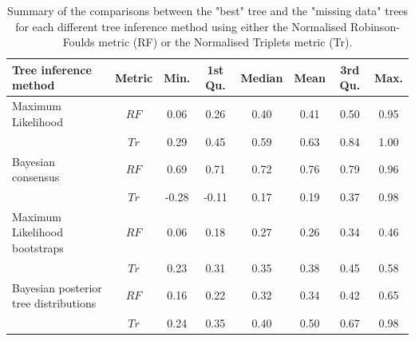 \documentclass[12pt,letterpaper]{article}
\begin{document}
\begin{landscape}
\begin{table}[ht]
\caption{Summary of the comparisons between the "best" tree and the "missing data" trees for each different tree inference method using either the Normalised Robinson-Foulds metric (RF) or the Normalised Triplets metric (Tr).}
\label{Tab_Supp_summary_metric_allparam}
\centering
\begin{tabular}{lccccccc}
  \hline
 Tree inference method & Metric & Min. & 1st Qu. & Median & Mean & 3rd Qu. & Max. \\ 
  \hline
  Maximum Likelihood                    & $RF$ & 0.06 & 0.26 & 0.40 & 0.41 & 0.50 & 0.95 \\ 
                                        & $Tr$ & 0.29 & 0.45 & 0.59 & 0.63 & 0.84 & 1.00 \\ 
  Bayesian consensus                    & $RF$ & 0.69 & 0.71 & 0.72 & 0.76 & 0.79 & 0.96 \\ 
                                        & $Tr$ & -0.28 & -0.11 & 0.17 & 0.19 & 0.37 & 0.98 \\ 
  Maximum Likelihood bootstraps         & $RF$ & 0.06 & 0.18 & 0.27 & 0.26 & 0.34 & 0.46 \\ 
                                        & $Tr$ & 0.23 & 0.31 & 0.35 & 0.38 & 0.45 & 0.58 \\ 
  Bayesian posterior tree distributions & $RF$ & 0.16 & 0.22 & 0.32 & 0.34 & 0.42 & 0.65 \\ 
                                        & $Tr$ & 0.24 & 0.35 & 0.40 & 0.50 & 0.67 & 0.98 \\ 
   \hline
\end{tabular}
\end{table}
\end{landscape}
\end{document}
